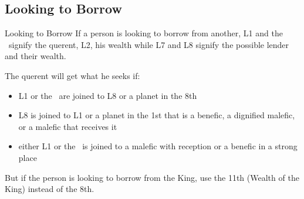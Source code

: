 \subsection{Looking to Borrow}
\begin{frame}[t]{Looking to Borrow}
If a person is looking to borrow from another, L1 and the \Moon\ signify the querent, L2, his wealth while L7 and L8 signify the possible lender and their wealth.

The querent will get what he seeks if:
\begin{itemize}
\item L1 or the \Moon\ are joined to L8 or a planet in the 8th
\item L8 is joined to L1 or a planet in the 1st that is a benefic, a dignified malefic, or a malefic that receives it
\item either  L1 or the \Moon\ is joined to a malefic with reception or a benefic in a strong place
\end{itemize}

But if the person is looking to borrow from the King, use the 11th (Wealth of the King) instead of the 8th.

\end{frame}